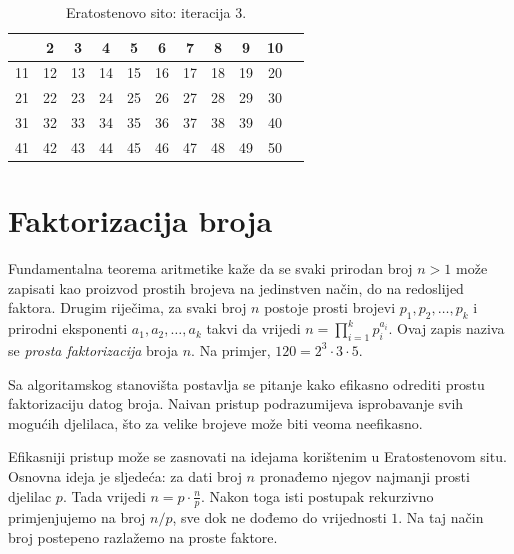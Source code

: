 \begin{table}[H]
	\centering
	\begin{tabular}{|c|c|c|c|c|c|c|c|c|c|c} \hline
		& 2 & 3 & \cellcolor{red!30}  4 & 5 & \cellcolor{red!30} 6 & 7 & \cellcolor{red!30} 8 & \cellcolor{red!30} 9 & \cellcolor{red!30} 10 \\ \hline
		11 &\cellcolor{red!30}  12 & 13 & \cellcolor{red!30} 14 & \cellcolor{red!30} 15 & \cellcolor{red!30} 16 & 17 & \cellcolor{red!30} \cellcolor{red!30} 18 & 19 & \cellcolor{red!30} \cellcolor{red!30} 20 \\ \hline
		\cellcolor{red!30} 21 & \cellcolor{red!30} 22 & 23 & \cellcolor{red!30} 24 & \cellcolor{red!90} 25 & \cellcolor{red!30} 26 & \cellcolor{red!30}  27 &\cellcolor{red!30}  28 & 29 & \cellcolor{red!30} \cellcolor{red!30} 30 \\ \hline
		31 & \cellcolor{red!30} 32 & \cellcolor{red!30} 33 & \cellcolor{red!30} 34 & \cellcolor{red!90} 35 & \cellcolor{red!30} 36 & 37 & \cellcolor{red!30} 38 & \cellcolor{red!30} 39 & \cellcolor{red!30} 40 \\ \hline
		41 & \cellcolor{red!30} 42 & 43 & \cellcolor{red!30} 44 & \cellcolor{red!30} 45 & \cellcolor{red!30} 46 & 47 &\cellcolor{red!30}  48 & 49 &\cellcolor{red!30}  50 \\ \hline     
	\end{tabular}
	\caption{Eratostenovo sito: iteracija 3.} \label{eratosten-sieve-it-3}
\end{table}

\section{Faktorizacija broja}

Fundamentalna teorema aritmetike kaže da se svaki prirodan broj $n>1$ može zapisati kao proizvod prostih brojeva na jedinstven način, do na redoslijed faktora. Drugim riječima, za svaki broj $n$ postoje prosti brojevi $p_1,p_2,\ldots,p_k$ i prirodni eksponenti $a_1,a_2,\ldots,a_k$ takvi da vrijedi $n=\prod_{i=1}^{k} p_i^{a_i}.$ Ovaj zapis naziva se \textit{prosta faktorizacija} broja $n$. Na primjer, $
120 = 2^3 \cdot 3 \cdot 5.$

\medskip

Sa algoritamskog stanovišta postavlja se pitanje kako efikasno odrediti prostu faktorizaciju datog broja. Naivan pristup podrazumijeva isprobavanje svih mogućih djelilaca, što za velike brojeve može biti veoma neefikasno.

Efikasniji pristup može se zasnovati na idejama korištenim u Eratostenovom situ. Osnovna ideja je sljedeća: za dati broj $n$ pronađemo njegov najmanji prosti djelilac $p$. Tada vrijedi $
n = p \cdot \frac{n}{p}.$ Nakon toga isti postupak rekurzivno primjenjujemo na broj $n/p$, sve dok ne dođemo do vrijednosti $1$. Na taj način broj postepeno razlažemo na proste faktore.

